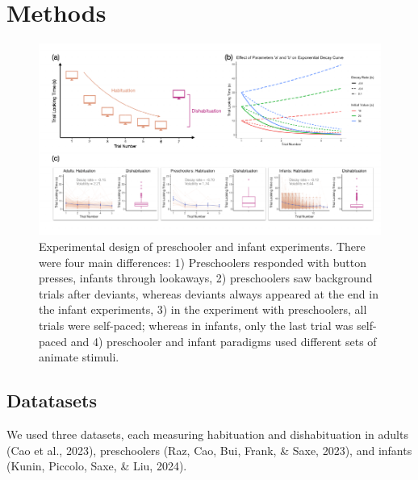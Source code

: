 \documentclass[10pt, letterpaper]{article}
\newenvironment{CodeChunk}{}{}
\begin{document}
\hypertarget{methods}{%
\section{Methods}\label{methods}}

\captionsetup{belowskip=0pt,aboveskip=0pt}

\begin{CodeChunk}
\begin{figure}[h]

{\centering \includegraphics{figs/experimental_design-1} 

}

\caption[Experimental design of preschooler and infant experiments]{Experimental design of preschooler and infant experiments. There were four main differences: 1) Preschoolers responded with button presses, infants through lookaways, 2) preschoolers saw background trials after deviants, whereas deviants always appeared at the end in the infant experiments, 3) in the experiment with preschoolers, all trials were self-paced; whereas in infants, only the last trial was self-paced and 4) preschooler and infant paradigms used different sets of animate stimuli.}\label{fig:experimental_design}
\end{figure}
\end{CodeChunk}

\hypertarget{datatasets}{%
\subsection{Datatasets}\label{datatasets}}

We used three datasets, each measuring habituation and dishabituation in
adults (Cao et al., 2023), preschoolers (Raz, Cao, Bui, Frank, \& Saxe,
2023), and infants (Kunin, Piccolo, Saxe, \& Liu, 2024).
\end{document}
